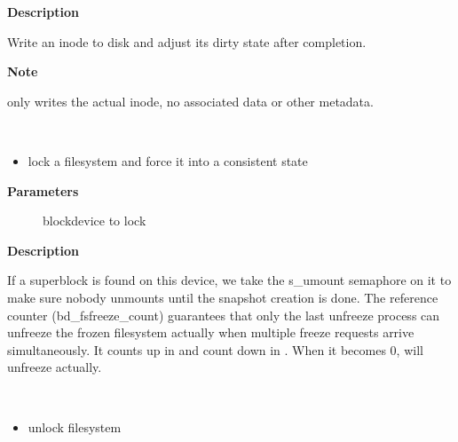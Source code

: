 \documentclass[a4paper,8pt,english]{sphinxmanual}
\begin{document}
\textbf{Description}

Write an inode to disk and adjust its dirty state after completion.

\textbf{Note}

only writes the actual inode, no associated data or other metadata.

\begin{fulllineitems}
\label{filesystems/index:c.freeze_bdev}~\begin{itemize}
\item {} 
lock a filesystem and force it into a consistent state

\end{itemize}

\end{fulllineitems}


\textbf{Parameters}
\begin{description}
\item[{}] \leavevmode
blockdevice to lock

\end{description}

\textbf{Description}

If a superblock is found on this device, we take the s\_umount semaphore
on it to make sure nobody unmounts until the snapshot creation is done.
The reference counter (bd\_fsfreeze\_count) guarantees that only the last
unfreeze process can unfreeze the frozen filesystem actually when multiple
freeze requests arrive simultaneously. It counts up in {\hyperref[filesystems/index:c.freeze_bdev]{\emph{}}} and
count down in {\hyperref[filesystems/index:c.thaw_bdev]{\emph{}}}. When it becomes 0, {\hyperref[filesystems/index:c.thaw_bdev]{\emph{}}} will unfreeze
actually.

\begin{fulllineitems}
\label{filesystems/index:c.thaw_bdev}~\begin{itemize}
\item {} 
unlock filesystem

\end{itemize}

\end{fulllineitems}
\end{document}
